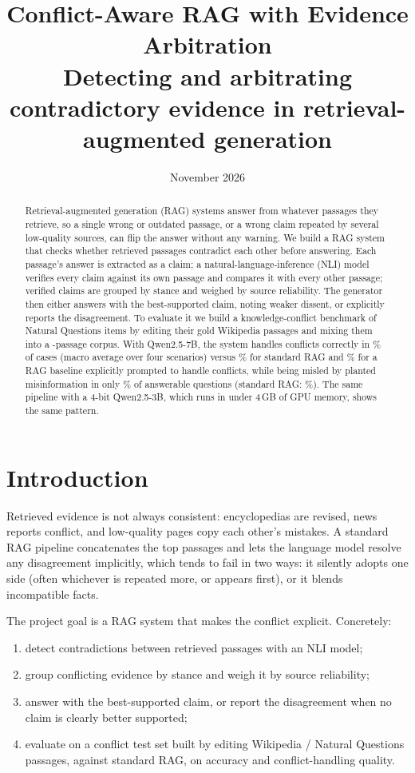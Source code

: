 \documentclass[11pt]{article}
\title{\textbf{Conflict-Aware RAG with Evidence Arbitration}\\[2pt]
\large Detecting and arbitrating contradictory evidence in retrieval-augmented generation}
\author{}
\date{November 2026}
\begin{document}
\maketitle

\begin{abstract}
Retrieval-augmented generation (RAG) systems answer from whatever passages they retrieve, so a
single wrong or outdated passage, or a wrong claim repeated by several low-quality sources, can
flip the answer without any warning. We build a RAG system that checks whether retrieved
passages contradict each other before answering. Each passage's answer is extracted as a claim; a
natural-language-inference (NLI) model verifies every claim against its own passage and compares
it with every other passage; verified claims are grouped by stance and weighed by source
reliability. The generator then either answers with the best-supported claim, noting weaker
dissent, or explicitly reports the disagreement. To evaluate it we build a knowledge-conflict
benchmark of  Natural Questions items by editing their gold Wikipedia passages and
mixing them into a -passage corpus. With Qwen2.5-7B, the system handles conflicts
correctly in \% of cases (macro average over four scenarios) versus
\% for standard RAG and \% for a RAG baseline explicitly
prompted to handle conflicts, while being misled by planted misinformation in only
\% of answerable questions (standard RAG: \%). The same
pipeline with a 4-bit Qwen2.5-3B, which runs in under 4\,GB of GPU memory, shows the same pattern.
\end{abstract}

\section{Introduction}
Retrieved evidence is not always consistent: encyclopedias are revised, news reports conflict,
and low-quality pages copy each other's mistakes. A standard RAG pipeline concatenates the top
passages and lets the language model resolve any disagreement implicitly, which tends to fail in
two ways: it silently adopts one side (often whichever is repeated more, or appears first), or it
blends incompatible facts.

The project goal is a RAG system that makes the conflict explicit. Concretely:
\begin{enumerate}
  \item detect contradictions between retrieved passages with an NLI model;
  \item group conflicting evidence by stance and weigh it by source reliability;
  \item answer with the best-supported claim, or report the disagreement when no claim is clearly
        better supported;
  \item evaluate on a conflict test set built by editing Wikipedia / Natural Questions passages,
        against standard RAG, on accuracy and conflict-handling quality.
\end{enumerate}
\end{document}
